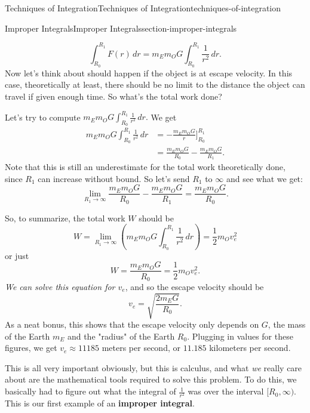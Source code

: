 \documentclass[oneside,10pt,]{book}
\newcommand{\terminology}[1]{\textbf{#1}}
\numberwithin{equation}{section}
\begin{document}
\begin{chapterptx}{Techniques of Integration}{}{Techniques of Integration}{}{}{techniques-of-integration}
\begin{sectionptx}{Improper Integrals}{}{Improper Integrals}{}{}{section-improper-integrals}
\begin{introduction}{}
\begin{equation*}
\int_{R_{0}}^{R_{1}}F(r)\,dr = m_{E}m_{O}G\int_{R_{0}}^{R_{1}}\frac{1}{r^{2}}\,dr.
\end{equation*}
Now let's think about should happen if the object is at escape velocity. In this case, theoretically at least, there should be no limit to the distance the object can travel if given enough time. So what's the total work done?%
\par
\hypertarget{p-576}{}%
Let's try to compute \(m_{E}m_{O}G\int_{R_{0}}^{R_{1}}\frac{1}{r^{2}}\,dr.\) We get%
\begin{align*}
m_{E}m_{O}G\int_{R_{0}}^{R_{1}}\frac{1}{r^{2}}\,dr & = -\frac{m_{E}m_{O}G}{r}\big]_{R_{0}}^{R_{1}} \\
& = \frac{m_{E}m_{O}G}{R_{0}} - \frac{m_{E}m_{O}G}{R_{1}}. 
\end{align*}
Note that this is still an underestimate for the total work theoretically done, since \(R_{1}\) can increase without bound. So let's send \(R_{1}\) to \(\infty\) and see what we get:%
\begin{equation*}
\lim_{R_{1}\to\infty}\frac{m_{E}m_{O}G}{R_{0}} - \frac{m_{E}m_{O}G}{R_{1}} = \frac{m_{E}m_{O}G}{R_{0}}.
\end{equation*}
%
\par
\hypertarget{p-577}{}%
So, to summarize, the total work \(W\) should be%
\begin{equation*}
W = \lim_{R_{1}\to\infty}\left(m_{E}m_{O}G\int_{R_{0}}^{R_{1}}\frac{1}{r^{2}}\,dr\right) = \frac{1}{2}m_{O}v_{e}^{2}
\end{equation*}
or just%
\begin{equation*}
W = \frac{m_{E}m_{O}G}{R_{0}} = \frac{1}{2}m_{O}v_{e}^{2}.
\end{equation*}
\emph{We can solve this equation for \(v_{e}\)}, and so the escape velocity should be%
\begin{equation*}
v_{e} = \sqrt{\frac{2 m_{E}G}{R_{0}}}.
\end{equation*}
As a neat bonus, this shows that the escape velocity only depends on \(G\), the mass of the Earth \(m_{E}\) and the "radius" of the Earth \(R_{0}\). Plugging in values for these figures, we get \(v_{e} \approx 11185\) meters per second, or \(11.185\) kilometers per second.%
\par
\hypertarget{p-578}{}%
This is all very important obviously, but this is calculus, and what \emph{we} really care about are the mathematical tools required to solve this problem. To do this, we basically had to figure out what the integral of \(\frac{1}{r^{2}}\) was over the interval \([R_{0},\infty)\). This is our first example of an \terminology{improper integral}.%

\end{introduction}
\end{sectionptx}
\end{chapterptx}
\end{document}
